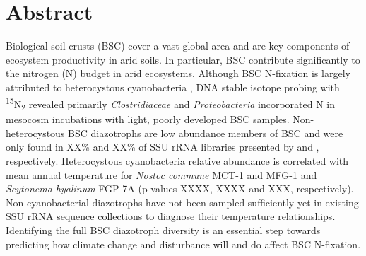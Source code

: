 \section{Abstract}
Biological soil crusts (BSC) cover a vast global area and are key components of ecosystem productivity in arid soils. In particular, BSC contribute significantly to the nitrogen (N) budget in arid ecosystems. Although BSC N-fixation is largely attributed to heterocystous cyanobacteria \cite{Yeager, 14766579, Yeager_2012}, DNA stable isotope probing with \textsuperscript{15}N\textsubscript{2} revealed primarily \textit{Clostridiaceae} and \textit{Proteobacteria} incorporated N in mesocosm incubations with light, poorly developed BSC samples. Non-heterocystous BSC diazotrophs are low abundance members of BSC and were only found in XX\% and XX\% of SSU rRNA libraries presented by \citet{Garcia_Pichel_2013} and \citet{Steven_2013}, respectively. Heterocystous cyanobacteria relative abundance is correlated with mean annual temperature for \textit{Nostoc commune} MCT-1 and MFG-1 and \textit{Scytonema hyalinum} FGP-7A (p-values XXXX, XXXX and XXX, respectively). Non-cyanobacterial diazotrophs have not been sampled sufficiently yet in existing SSU rRNA sequence collections to diagnose their temperature relationships. Identifying the full BSC diazotroph diversity is an essential step towards predicting how climate change and disturbance will and do affect BSC N-fixation.